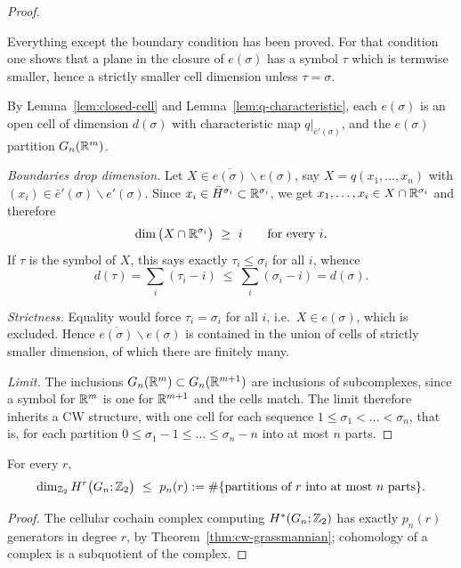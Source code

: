 \begin{proof}
\begin{strategy}
Everything except the boundary condition has been proved. For that condition one
shows that a plane in the closure of $e(\sigma)$ has a symbol $\tau$ which is
termwise smaller, hence a strictly smaller cell dimension unless $\tau=\sigma$.
\end{strategy}

 By Lemma~\ref{lem:closed-cell} and Lemma~\ref{lem:q-characteristic},
each $e(\sigma)$ is an open cell of dimension $d(\sigma)$ with characteristic
map $q|_{\bar e'(\sigma)}$, and the $e(\sigma)$ partition $G_n(\mathbb{R}^m)$.

 \emph{Boundaries drop dimension.} Let
$X\in\overline{e(\sigma)}\smallsetminus e(\sigma)$, say $X=q(x_1,\dots,x_n)$
with $(x_i)\in\bar e'(\sigma)\smallsetminus e'(\sigma)$. Since
$x_i\in\bar H^{\sigma_i}\subset\mathbb{R}^{\sigma_i}$, we get
$x_1,\dots,x_i\in X\cap\mathbb{R}^{\sigma_i}$ and therefore
\[
\dim\big(X\cap\R^{\sigma_i}\big)\ \ge\ i\qquad\text{for every } i .
\]
If $\tau$ is the symbol of $X$, this says exactly $\tau_i\le\sigma_i$ for all
$i$, whence
\[
d(\tau)=\sum_i(\tau_i-i)\ \le\ \sum_i(\sigma_i-i)=d(\sigma).
\]

 \emph{Strictness.} Equality would force $\tau_i=\sigma_i$ for all $i$,
i.e.\ $X\in e(\sigma)$, which is excluded. Hence
$\overline{e(\sigma)}\smallsetminus e(\sigma)$ is contained in the union of
cells of strictly smaller dimension, of which there are finitely many.

 \emph{Limit.} The inclusions $G_n(\mathbb{R}^m)\subset G_n(\mathbb{R}^{m+1})$ are
inclusions of subcomplexes, since a symbol for $\mathbb{R}^m$ is one for $\mathbb{R}^{m+1}$ and
the cells match. The limit therefore inherits a CW structure, with one cell for
each sequence $1\le\sigma_1<\dots<\sigma_n$, that is, for each partition
$0\le\sigma_1-1\le\dots\le\sigma_n-n$ into at most $n$ parts.
\end{proof}

\begin{corollary}\label{cor:HGn-rank}
For every $r$,
\[
\dim_{\mathbb{Z}_2}H^r\big(G_n;\mathbb{Z}_2\big)\ \le\
p_n(r):=\#\{\text{partitions of }r\text{ into at most }n\text{ parts}\}.
\]
\end{corollary}

\begin{proof}
The cellular cochain complex computing $H^*(G_n;\mathbb{Z}_2)$ has exactly $p_n(r)$
generators in degree $r$, by Theorem~\ref{thm:cw-grassmannian}; cohomology of a
complex is a subquotient of the complex.
\end{proof}

